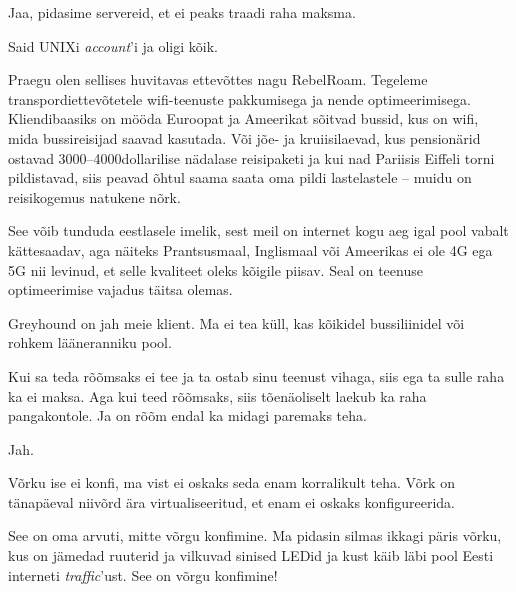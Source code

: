 
Jaa, pidasime servereid, et ei peaks traadi raha maksma.


Said UNIXi \emph{account}'i ja oligi kõik.


Praegu olen sellises huvitavas ettevõttes nagu RebelRoam. 
Tegeleme transpordiettevõtetele wifi-teenuste pakkumisega ja nende 
optimeerimisega. Kliendibaasiks on mööda Euroopat ja Ameerikat 
sõitvad bussid, kus on wifi, mida bussireisijad saavad kasutada. 
Või jõe- ja kruiisilaevad, kus pensionärid ostavad 3000--4000dollarilise nädalase reisipaketi ja kui nad Pariisis Eiffeli torni 
pildistavad, siis peavad õhtul saama saata oma pildi lastelastele -- muidu on 
reisikogemus natukene nõrk. 

See võib tunduda eestlasele imelik, sest meil on internet kogu aeg igal pool 
vabalt kättesaadav, aga näiteks Prantsusmaal, Inglismaal või Ameerikas ei 
ole 4G ega 5G nii levinud, et selle kvaliteet oleks kõigile piisav. Seal 
on teenuse optimeerimise vajadus täitsa olemas.


Greyhound on jah meie klient. Ma ei tea küll, kas kõikidel bussiliinidel või rohkem 
lääneranniku pool.


Kui sa teda rõõmsaks ei tee ja ta ostab sinu teenust vihaga, siis ega ta sulle raha
ka ei maksa. Aga kui teed rõõmsaks, siis tõenäoliselt laekub ka raha 
pangakontole. Ja on rõõm endal ka midagi paremaks teha.


Jah.


Võrku ise ei konfi, ma vist ei oskaks seda enam korralikult teha. Võrk on 
tänapäeval niivõrd ära virtualiseeritud, et enam ei oskaks konfigureerida.


See on oma arvuti, mitte võrgu konfimine. Ma pidasin silmas
ikkagi päris võrku, kus on jämedad ruuterid ja vilkuvad sinised LEDid ja kust käib 
läbi pool Eesti interneti \emph{traffic}'ust. See on võrgu 
konfimine! 